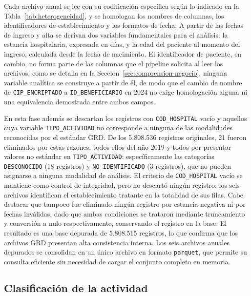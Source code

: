 Cada archivo anual se lee con su codificación específica según lo indicado en la
Tabla~\ref{tab:heterogeneidad}, y se homologan los nombres de columnas, los
identificadores de establecimiento y los formatos de fecha. A partir de las
fechas de ingreso y alta se derivan dos variables fundamentales para el análisis:
la estancia hospitalaria, expresada en días, y la edad del paciente al momento
del ingreso, calculada desde la fecha de nacimiento. El identificador de paciente, en cambio, no forma parte de las columnas que el
pipeline solicita al leer los archivos: como se detalla en la
Sección~\ref{sec:comprension-negocio}, ninguna variable analítica se construye a
partir de él, de modo que el cambio de nombre de \texttt{CIP\_ENCRIPTADO} a
\texttt{ID\_BENEFICIARIO} en 2024 no exige homologación alguna ni una
equivalencia demostrada entre ambos campos.

En esta fase además se descartan los registros con \texttt{COD\_HOSPITAL} vacío y
aquellos cuya variable \texttt{TIPO\_ACTIVIDAD} no corresponde a ninguna de las
modalidades reconocidas por el estándar GRD. De los 5.808.536 registros
originales, 21 fueron eliminados por estas razones, todos ellos del año 2019 y
todos por presentar valores no estándar en \texttt{TIPO\_ACTIVIDAD}:
específicamente las categorías \texttt{DESCONOCIDO} (18 registros) y
\texttt{NO IDENTIFICADO} (3 registros), que no pueden asignarse a ninguna
modalidad de análisis. El criterio de \texttt{COD\_HOSPITAL} vacío se mantiene
como control de integridad, pero no descartó ningún registro: los seis archivos
identifican el establecimiento tratante en la totalidad de sus filas. Cabe
destacar que tampoco fue eliminado ningún registro por estancia negativa ni por
fechas inválidas, dado que ambas condiciones se trataron mediante truncamiento y
conversión a nulo respectivamente, conservando el registro en la base. El
resultado es una base depurada de 5.808.515 registros, lo que confirma que
los archivos GRD presentan alta consistencia interna. Los seis archivos anuales depurados se consolidan en
un único archivo en formato \texttt{parquet}, que permite su consulta eficiente
sin necesidad de cargar el conjunto completo en memoria.

\subsection{Clasificación de la actividad}
\label{sec:clasificacion-actividad}


